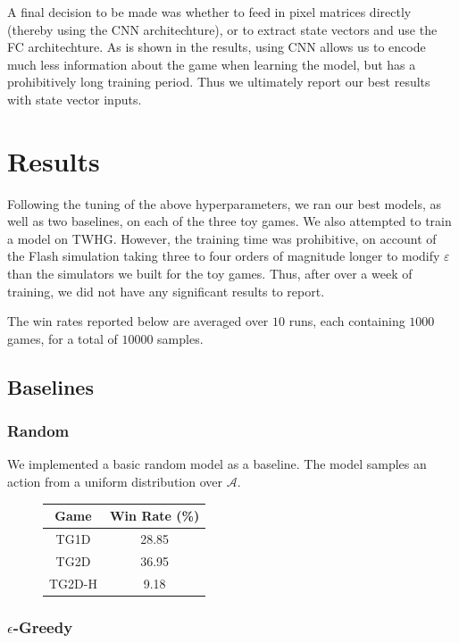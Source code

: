 \documentclass[12pt]{article}
\begin{document}
A final decision to be made was whether to feed in pixel matrices directly (thereby using the CNN architechture), or to extract state vectors and use the FC architechture. As is shown in the results, using CNN allows us to encode much less information about the game when learning the model, but has a prohibitively long training period. Thus we ultimately report our best results with state vector inputs.

\section{Results}

Following the tuning of the above hyperparameters, we ran our best models, as well as two baselines, on each of the three toy games. We also attempted to train a model on TWHG. However, the training time was prohibitive, on account of the Flash simulation taking three to four orders of magnitude longer to modify $\varepsilon$ than the simulators we built for the toy games. Thus, after over a week of training, we did not have any significant results to report.

The win rates reported below are averaged over $10$ runs, each containing $1000$ games, for a total of $10000$ samples.

\subsection{Baselines}

\subsubsection{Random}

We implemented a basic random model as a baseline. The model samples an action from a uniform distribution over $\mathcal{A}$.

\begin{figure}[H]
  \begin{tabular}{c | c}
    Game & Win Rate (\%) \\ \hline
    TG1D & 28.85 \\ \hline
    TG2D & 36.95 \\ \hline
    TG2D-H & 9.18 \\
  \end{tabular}
  \centering
\end{figure}

\subsubsection{$\epsilon$-Greedy}
\end{document}
